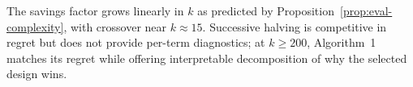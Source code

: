 The savings factor grows linearly in $k$ as predicted by Proposition~\ref{prop:eval-complexity}, with crossover near $k{\approx}15$. Successive halving is competitive in regret but does not provide per-term diagnostics; at $k{\ge}200$, Algorithm~1 matches its regret while offering interpretable decomposition of why the selected design wins.

